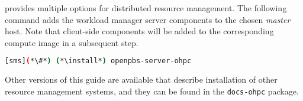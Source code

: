 \OHPC{} provides multiple options for distributed resource management. The
following command adds the \rms{} workload manager server components to the
chosen {\em master} host. Note that client-side components will be added to
the corresponding compute image in a subsequent step.

\begin{lstlisting}[language=bash,keywords={}]
[sms](*\#*) (*\install*) openpbs-server-ohpc
\end{lstlisting}

Other versions of this guide are available that describe installation of other
resource management systems, and they can be found in the \texttt{docs-ohpc}
package.
